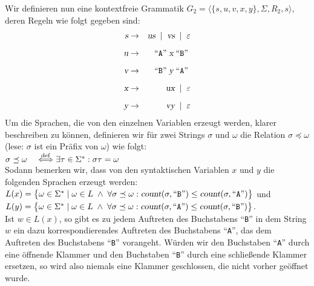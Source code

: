 Wir definieren nun eine  kontextfreie Grammatik $G_2 = \langle \{s, u, v, x, y\}, \Sigma, R_2, s \rangle$,
deren Regeln wie folgt gegeben sind:
\hspace*{1.3cm}
\begin{eqnarray*}
\textsl{s} & \rightarrow & \textsl{u} \textsl{s} \;\mid\; \textsl{v} \textsl{s} \;\mid\; \varepsilon \\[0.2cm]
\textsl{u} & \rightarrow &\;\mbox{``\texttt{A}''}\; \textsl{x} \;\mbox{``\texttt{B}''}\;                \\[0.2cm]
\textsl{v} & \rightarrow & \;\mbox{``\texttt{B}''}\; \textsl{y} \;\mbox{``\texttt{A}''}\;                \\[0.2cm]
\textsl{x} & \rightarrow & \textsl{u} \textsl{x} \;\mid\; \varepsilon \\[0.2cm]
\textsl{y} & \rightarrow & \textsl{v} \textsl{y} \;\mid\; \varepsilon          
\end{eqnarray*}
Um die Sprachen, die von den einzelnen Variablen erzeugt werden, klarer beschreiben zu
k\"onnen, definieren wir f\"ur zwei Strings $\sigma$ und $\omega$ die Relation $\sigma \preceq \omega$ (lese: $\sigma$ ist ein
Pr\"afix von $\omega$) wie folgt:
\\[0.2cm]
\hspace*{1.3cm}
$\sigma \preceq \omega \quad \stackrel{\rm{def}}{\Longleftrightarrow} \exists \tau \in \Sigma^*: \sigma \tau = \omega$
\\[0.2cm]
Sodann bemerken wir, dass von den syntaktischen Variablen $x$ und $y$ die folgenden
Sprachen erzeugt werden:
\\[0.2cm]
\hspace*{1.3cm} 
$L(x) = \bigl\{ \omega \in \Sigma^* \mid \omega \in L \;\wedge\; \forall \sigma \preceq \omega : 
                  \textsl{count}(\sigma,\mbox{``\texttt{B}''}) \leq \textsl{count}(\sigma,\mbox{``\texttt{A}''}) \bigr\}$
\quad und \\[0.2cm]
\hspace*{1.3cm}
$L(y) = \bigl\{ \omega \in \Sigma^* \mid \omega \in L \;\wedge\; \forall \sigma \preceq \omega : 
                  \textsl{count}(\sigma, \mbox{``\texttt{A}''}) \leq \textsl{count}(\sigma, \mbox{``\texttt{B}''}) \bigr\}$.
\\[0.2cm]
Ist $w \in L(x)$, so gibt es zu jedem Auftreten des Buchstabens ``\texttt{B}'' in dem String $w$ ein
dazu korrespondierendes Auftreten des Buchstabens ``\texttt{A}'', das dem Auftreten des Buchstabens
``\texttt{B}'' vorangeht.  W\"urden wir den Buchstaben
``\texttt{A}'' durch eine \"offnende Klammer und den Buchstaben ``\texttt{B}'' durch eine schlie{\ss}ende
Klammer ersetzen, so wird also niemals eine Klammer geschlossen, die nicht vorher ge\"offnet wurde.
